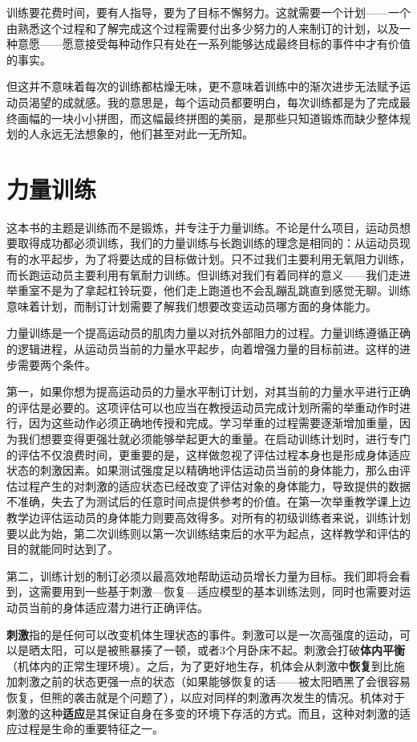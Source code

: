 训练要花费时间，要有人指导，要为了目标不懈努力。这就需要一个计划——一个由熟悉这个过程和了解完成这个过程需要付出多少努力的人来制订的计划，以及一种意愿——愿意接受每种动作只有处在一系列能够达成最终目标的事件中才有价值的事实。

但这并不意味着每次的训练都枯燥无味，更不意味着训练中的渐次进步无法赋予运动员渴望的成就感。我的意思是，每个运动员都要明白，每次训练都是为了完成最终画幅的一块小小拼图，而这幅最终拼图的美丽，是那些只知道锻炼而缺少整体规划的人永远无法想象的，他们甚至对此一无所知。

\section{力量训练}

这本书的主题是训练而不是锻炼，并专注于力量训练。不论是什么项目，运动员想要取得成功都必须训练，我们的力量训练与长跑训练的理念是相同的：从运动员现有的水平起步，为了将要达成的目标做计划。只不过我们主要利用无氧阻力训练，而长跑运动员主要利用有氧耐力训练。但训练对我们有着同样的意义——我们走进举重室不是为了拿起杠铃玩耍，他们走上跑道也不会乱蹦乱跳直到感觉无聊。训练意味着计划，而制订计划需要了解我们想要改变运动员哪方面的身体能力。

力量训练是一个提高运动员的肌肉力量以对抗外部阻力的过程。力量训练遵循正确的逻辑进程，从运动员当前的力量水平起步，向着增强力量的目标前进。这样的进步需要两个条件。

第一，如果你想为提高运动员的力量水平制订计划，对其当前的力量水平进行正确的评估是必要的。这项评估可以也应当在教授运动员完成计划所需的举重动作时进行，因为这些动作必须正确地传授和完成。学习举重的过程需要逐渐增加重量，因为我们想要变得更强壮就必须能够举起更大的重量。在启动训练计划时，进行专门的评估不仅浪费时间，更重要的是，这样做忽视了评估过程本身也是形成身体适应状态的刺激因素。如果测试强度足以精确地评估运动员当前的身体能力，那么由评估过程产生的对刺激的适应状态已经改变了评估对象的身体能力，导致提供的数据不准确，失去了为测试后的任意时间点提供参考的价值。在第一次举重教学课上边教学边评估运动员的身体能力则要高效得多。对所有的初级训练者来说，训练计划要以此为始，第二次训练则以第一次训练结束后的水平为起点，这样教学和评估的目的就能同时达到了。

第二，训练计划的制订必须以最高效地帮助运动员增长力量为目标。我们即将会看到，这需要用到一些基于刺激—恢复—适应模型的基本训练法则，同时也需要对运动员当前的身体适应潜力进行正确评估。

\textbf{刺激}指的是任何可以改变机体生理状态的事件。刺激可以是一次高强度的运动，可以是晒太阳，可以是被熊暴揍了一顿，或者3个月卧床不起。刺激会打破\textbf{体内平衡}（机体内的正常生理环境）。之后，为了更好地生存，机体会从刺激中\textbf{恢复}到比施加刺激之前的状态更强一点的状态（如果能够恢复的话——被太阳晒黑了会很容易恢复，但熊的袭击就是个问题了），以应对同样的刺激再次发生的情况。机体对于刺激的这种\textbf{适应}是其保证自身在多变的环境下存活的方式。而且，这种对刺激的适应过程是生命的重要特征之一。

